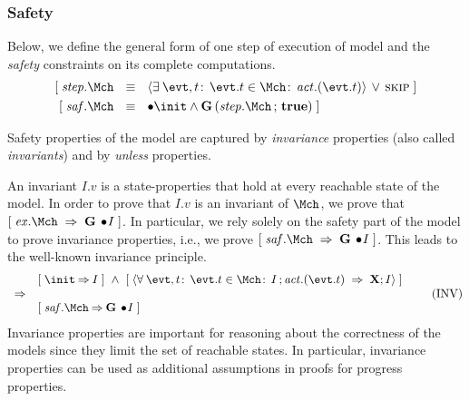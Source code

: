 \subsubsection{Safety} Below, we define the general form of one step
of execution of model \Mch and the \emph{safety} constraints on its
complete computations.
\begin{align}
  \ew{\step.\Mch  \Wide{&\eqv} \qexists{\evt, t}{\evt.t \in \Mch}{\action.(\evt.t)} \,\lor\, \SKIP} \label{eq:step} \\
  \ew{\safety.\Mch  \Wide{&\eqv}  \initially \init \land
    \G(\step.\Mch \, ; \,\ctrue)}
\end{align}
% 

Safety properties of the model are captured by \emph{invariance} properties
(also called \emph{invariants}) and by \emph{unless} properties. 

An invariant $I.v$ is a state-properties that hold at every reachable state of the model.
In order to prove that $I.v$ is an invariant of $\Mch$,
we prove that $\ew{\execution.\Mch \wide{\limp} \G \initially \! I}$.
In particular, we rely solely on the safety part of the model to prove
invariance properties, i.e., we prove $\ew{\safety.\Mch \wide{\limp} \G
  \initially \! I}$.  This leads to the well-known invariance principle.
\begin{equation}
  \begin{array}{ll}
    & \ew{\init \limp I} \wide{\land} 
    \ew{\qforall{\evt, t}{\evt.t \in \Mch}{I \, ;  \action.(\evt.t) ~\limp~ \X;I}} \\
    \implies & \\
    & \ew{\safety.\Mch \limp \G \initially \! I}
  \end{array}
  \tag{INV}
\end{equation}
Invariance properties are important for reasoning about the correctness
of the models since they limit the set of reachable states.  In
particular, invariance properties can be used as additional
assumptions in proofs for progress properties.

